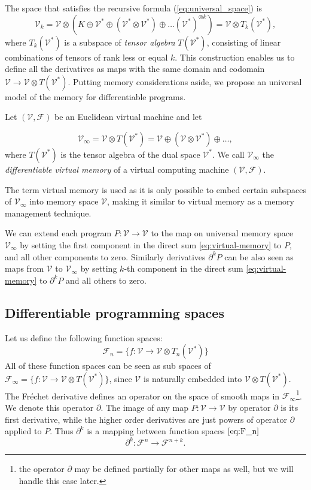 \documentclass[smallcondensed]{svjour3}
\newcommand{\VV}{\mathcal{V}}
\newcommand{\F}{\mathcal{F}}
\newcommand{\D}{\partial}
\begin{document}
  The space that satisfies the recursive formula (\ref{eq:universal_space}) is
  \begin{equation}
    \label{eq:k-th-virtual-space}
    \VV_k = \VV\otimes \left(K\oplus \VV^* \oplus (\VV^*\otimes \VV^*)\oplus\ldots
      (\VV^*)^{\otimes k}\right) = \VV\otimes T_k(\VV^*),
  \end{equation}
  where $T_k(\VV^*)$ is a subspace of \emph{tensor algebra} $T(\VV^*)$, consisting of
  linear combinations of tensors of rank less or equal $k$. This construction
  enables us to define all the derivatives as maps with 
  the same domain and codomain $\VV\to \VV\otimes T(\VV^*)$.
  Putting memory considerations aside, we propose an universal model of the
  memory for differentiable programs.
\begin{definition}\label{def:VV}
Let $(\VV,\F)$ be an Euclidean virtual machine and let  

\begin{equation}
\VV_\infty = \VV\otimes T(\VV^*) = \VV\oplus
(\VV\otimes\VV^*)\oplus\ldots,\label{eq:virtual-memory}
\end{equation}
where $T(\VV^*)$ is the tensor algebra of the dual space $\VV^*$.
We call $\VV_\infty$ the \emph{differentiable virtual memory} of a virtual
computing machine $(\VV,\F)$.
\end{definition}
The term virtual memory is used as it is only possible to embed certain subspaces of $\VV_\infty$ into memory space $\VV$, making it similar to
virtual memory as a memory management technique.  

We can extend each program $P:\VV\to \VV$ to the map on
universal memory space $\VV_\infty$ by setting the first component in the direct sum
\eqref{eq:virtual-memory} to $P$, and all other components to zero. Similarly
derivatives $\D^k P$ can be also seen as maps  from $\VV$ to $\VV_\infty$ by
setting $k$-th component in the direct sum \eqref{eq:virtual-memory} to $\D^k P$
and all others to zero. 
\subsection{Differentiable programming spaces}

Let us define the following function spaces:
 \begin{equation}\label{eq:F_n}
 	\F_n=\{f:\VV\to \VV\otimes T_n(\VV^*)\}
 \end{equation}
All of these function spaces can be seen as sub spaces of $\F_\infty=\{f:\VV\to \VV\otimes
T(\VV^*)\}$, since $\VV$ is naturally embedded into $ \VV\otimes T(\VV^*)$. The
Fréchet derivative defines an operator on the space of smooth maps in $\F_\infty$\footnote{the operator $\D$ may be defined partially for other maps as
   well, but we will handle this case later.}. We denote this operator $\D$. The image of any map
 $P:\VV\to \VV$ by operator $\D$ is its first derivative, while the higher order
 derivatives are just powers of operator $\D$ applied to $P$.
 Thus $\D^k$ is a mapping between function spaces $\eqref{eq:F_n}$
 \begin{equation}\label{eq:toFn+k}
 \D^k:\F^n\to\F^{n+k}.
 \end{equation}
 
\end{document}
